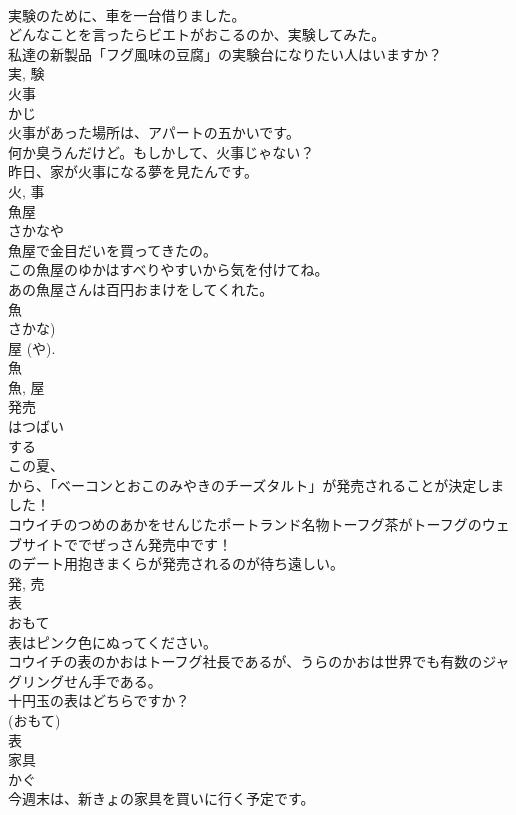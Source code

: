 \documentclass[8pt]{extreport}
\begin{document}
\begin{CJK}{UTF8}{min}
\\	実験のために、車を一台借りました。	
\\	どんなことを言ったらビエトがおこるのか、実験してみた。	
\\	私達の新製品「フグ風味の豆腐」の実験台になりたい人はいますか？	
\\	実, 験	
\\	火事	
\\	かじ	
\\	火事があった場所は、アパートの五かいです。	
\\	何か臭うんだけど。もしかして、火事じゃない？	
\\	昨日、家が火事になる夢を見たんです。	
\\	火, 事	
\\	魚屋	
\\	さかなや	
\\	魚屋で金目だいを買ってきたの。	
\\	この魚屋のゆかはすべりやすいから気を付けてね。	
\\	あの魚屋さんは百円おまけをしてくれた。	
\\	魚 
\\	さかな) 
\\	屋 (や). 
\\	魚 
\\	魚, 屋	
\\	発売	
\\	はつばい	
\\	する 
\\	この夏、
\\	から、「ベーコンとおこのみやきのチーズタルト」が発売されることが決定しました！	
\\	コウイチのつめのあかをせんじたポートランド名物トーフグ茶がトーフグのウェブサイトででぜっさん発売中です！	
\\	のデート用抱きまくらが発売されるのが待ち遠しい。	
\\	発, 売	
\\	表	
\\	おもて	
\\	表はピンク色にぬってください。	
\\	コウイチの表のかおはトーフグ社長であるが、うらのかおは世界でも有数のジャグリングせん手である。	
\\	十円玉の表はどちらですか？	
\\	(おもて)
\\	表	
\\	家具	
\\	かぐ	
\\	今週末は、新きょの家具を買いに行く予定です。	

\end{CJK}
\end{document}
